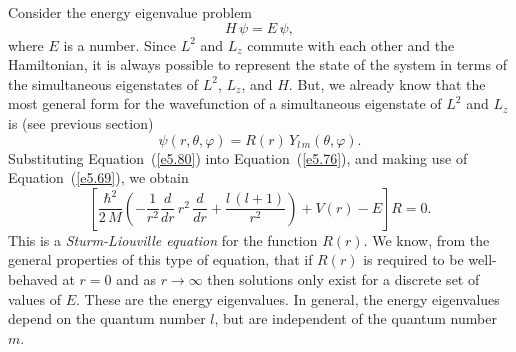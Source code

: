 Consider the energy eigenvalue problem
\begin{equation}
H\,\psi = E\,\psi,
\end{equation}
where $E$ is a number. Since $L^2$ and $L_z$ commute with each other and
the Hamiltonian, it is always possible to represent the state of the
system in terms of the simultaneous eigenstates of $L^2$, $L_z$, and $H$.
But, we already know that the most general form for the wavefunction of
a simultaneous
eigenstate of $L^2$ and $L_z$ is (see previous section)
\begin{equation}\label{e5.80}
\psi(r, \theta, \varphi) = R(r) \,Y_{l\,m}(\theta, \varphi).
\end{equation}
Substituting Equation~(\ref{e5.80}) into Equation~(\ref{e5.76}), and making use of Equation~(\ref{e5.69}), we
obtain
\begin{equation}\label{e5.81}
\left[\frac{\hbar^2}{2\,M} \left(-\frac{1}{r^2} \frac{d}{dr}\,r^2\,\frac{d}{dr}
+\frac{l\,(l+1)}{r^2}\right) + V(r) - E\right] R = 0.
\end{equation}
This is a {\em Sturm-Liouville equation}\/ for the function $R(r)$. We know,
from the general properties of this type of equation, 
that if $R(r)$ is required to be well-behaved  at $r=0$ and as $r\rightarrow
\infty$ then solutions only exist for a discrete set of values of $E$. These
are the energy eigenvalues. In general, the energy eigenvalues depend
on the quantum number $l$, but are independent of the quantum number $m$. 

